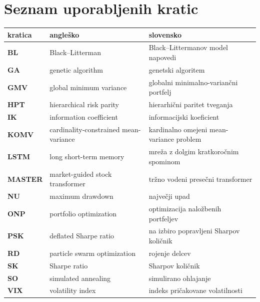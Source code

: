 \chapter*{Seznam uporabljenih kratic}

\begin{tabular}{l|l|l}
  {\bf kratica} & {\bf angleško} & {\bf slovensko} \\ \hline
  {\bf BL}    & Black--Litterman                    & Black--Littermanov model napovedi \\
  {\bf GA}    & genetic algorithm                   & genetski algoritem \\
  {\bf GMV}   & global minimum variance             & globalni minimalno-variančni portfelj \\
  {\bf HPT}   & hierarchical risk parity            & hierarhični paritet tveganja \\
  {\bf IK}    & information coefficient             & informacijski koeficient \\
  {\bf KOMV}  & cardinality-constrained mean-variance & kardinalno omejeni mean-variance problem \\
  {\bf LSTM}  & long short-term memory              & mreža z dolgim kratkoročnim spominom \\
  {\bf MASTER}& market-guided stock transformer     & tržno vodeni presečni transformer \\
  {\bf NU}    & maximum drawdown                    & največji upad \\
  {\bf ONP}   & portfolio optimization              & optimizacija naložbenih portfeljev \\
  {\bf PSK}   & deflated Sharpe ratio               & na izbiro popravljeni Sharpov količnik \\
  {\bf RD}    & particle swarm optimization         & rojenje delcev \\
  {\bf SK}    & Sharpe ratio                        & Sharpov količnik \\
  {\bf SO}    & simulated annealing                 & simulirano ohlajanje \\
  {\bf VIX}   & volatility index                    & indeks pričakovane volatilnosti \\
\end{tabular}
